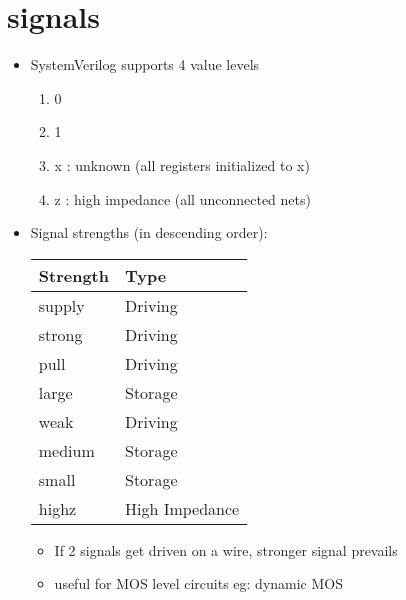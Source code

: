 \documentclass[11pt,twoside,a4paper,titlepage]{article}
\begin{document}
\section{signals}
\begin{itemize}
    \item SystemVerilog supports 4 value levels
        \begin{enumerate}
            \item 0
            \item 1
            \item x : unknown (all registers initialized to x)
            \item z : high impedance (all unconnected nets)
        \end{enumerate}
    \item Signal strengths (in descending order):\\
        \begin{center}
            \begin{tabular}[c]{|l|l|} \hline
                \textbf{Strength}  & \textbf{Type} \\
                \hline
                supply    &  Driving \\
                \hline
                strong    &  Driving \\
                \hline
                pull      &  Driving \\
                \hline
                large     &  Storage \\
                \hline
                weak      &  Driving \\
                \hline
                medium    &  Storage \\
                \hline
                small     &  Storage \\
                \hline
                highz     &  High Impedance \\
                \hline
            \end{tabular}
        \end{center}
        \begin{itemize}
            \item If 2 signals get driven on a wire, stronger signal prevails
            \item useful for MOS level circuits eg: dynamic MOS
        \end{itemize}
\end{itemize}
\end{document}
